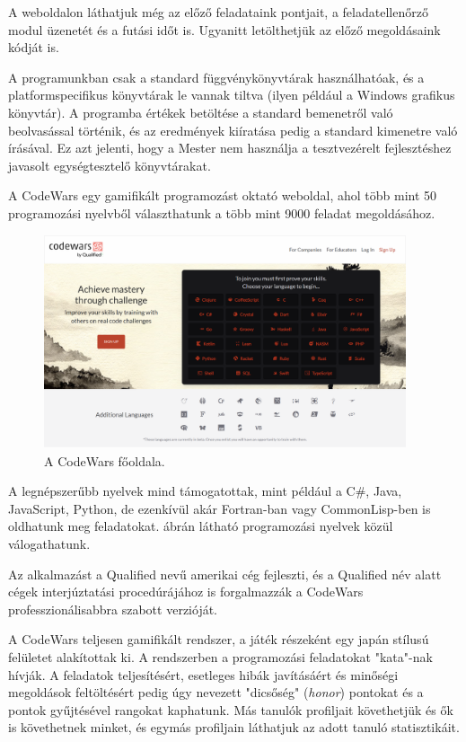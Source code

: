A weboldalon láthatjuk még az előző feladataink pontjait, a feladatellenőrző modul üzenetét és a futási időt is. Ugyanitt letölthetjük az előző megoldásaink kódját is.

A programunkban csak a standard függvénykönyvtárak használhatóak, és a platformspecifikus könyvtárak le vannak tiltva (ilyen például a Windows grafikus könyvtár). A programba értékek betöltése a standard bemenetről való beolvasással történik, és az eredmények kiíratása pedig a standard kimenetre való írásával. Ez azt jelenti, hogy a Mester nem használja a tesztvezérelt fejlesztéshez javasolt egységtesztelő könyvtárakat.


A CodeWars egy gamifikált programozást oktató weboldal, ahol több mint 50 programozási nyelvből választhatunk a több mint 9000 feladat megoldásához. \cite{codewars}

\begin{figure}[h]
    \centering
    \includegraphics[width=0.95\textwidth]{images/codewars_homepage.png}
    \caption{A CodeWars főoldala.}
    \label{fig:codewars_homepage}
\end{figure}

A legnépszerűbb nyelvek mind támogatottak, mint például a C\#, Java, JavaScript, Python, de ezenkívül akár Fortran-ban vagy CommonLisp-ben is oldhatunk meg feladatokat.  ábrán látható programozási nyelvek közül válogathatunk.

Az alkalmazást a Qualified nevű amerikai cég fejleszti, és a Qualified név alatt cégek interjúztatási procedúrájához is forgalmazzák a CodeWars professzionálisabbra szabott verzióját. \cite{qualified}

A CodeWars teljesen gamifikált rendszer, a játék részeként egy japán stílusú felületet alakítottak ki. A rendszerben a programozási feladatokat "kata"-nak hívják. A feladatok teljesítésért, esetleges hibák javításáért és minőségi megoldások feltöltésért pedig úgy nevezett "dicsőség" (\emph{honor}) pontokat és a pontok gyűjtésével rangokat kaphatunk. Más tanulók profiljait követhetjük és ők is követhetnek minket, és egymás profiljain láthatjuk az adott tanuló statisztikáit.

